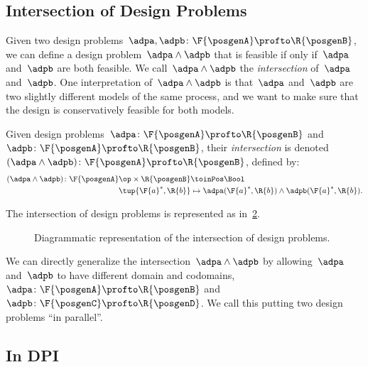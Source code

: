 %

\begin{figure}[h!]
  \centering
  \caption{\label{fig:dpcoproduct}}
\end{figure}

\subsection{Intersection of Design Problems}

Given two design problems~$\adpa, \adpb \colon \F{\posgenA} \profto \R{\posgenB}$, we can define a design problem~$\adpa \wedge \adpb$ that is feasible if only if~$\adpa$ and~$\adpb$ are both feasible.
We call~$\adpa \wedge \adpb$ the \emph{intersection} of~$\adpa$ and~$\adpb$.
One interpretation of~$\adpa \wedge \adpb$ is that~$\adpa$ and~$\adpb$ are two slightly different models of the same process, and we want to make sure that the design is conservatively feasible for both models.

\begin{definition}
  \label{def:intersection_dp}
  \label{def:dp-intersection}
  Given design problems~$\adpa\colon \F{\posgenA} \profto \R{\posgenB}$ and~$\adpb\colon \F{\posgenA} \profto \R{\posgenB}$,
  their \emph{intersection} is denoted~$(\adpa \wedge \adpb)\colon \F{\posgenA} \profto \R{\posgenB}$, defined by:
  \begin{equation}
    \begin{aligned}
    (\adpa \wedge \adpb)
      \colon \F{\posgenA}\op \times \R{\posgenB} & \toinPos \Bool \\
      \tup{\F{a}^*, \R{b}} & \mapsto \adpa(\F{a}^*, \R{b}) \wedge  \adpb(\F{a}^*, \R{b}).
    \end{aligned}
  \end{equation}
\end{definition}
The intersection of design problems is represented as in~\cref{fig:intersectiondp}.

\begin{figure}[h!]
  \begin{center}
  \end{center}
  \caption{Diagrammatic representation of the intersection of design problems. }
  \label{fig:intersectiondp}
\end{figure}

We can directly generalize the intersection~$\adpa \wedge \adpb$ by allowing~$\adpa$ and~$\adpb$ to have different domain and codomains,~$\adpa \colon \F{\posgenA} \profto \R{\posgenB}$ and~$\adpb \colon \F{\posgenC} \profto \R{\posgenD}$.
We call this putting two design problems ``in parallel''.

\subsection{In DPI}\label{subsec:dpi-intersection}

